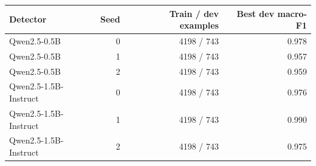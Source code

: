 \begin{tabular}{lrrr}\toprule
Detector & Seed & Train / dev examples & Best dev macro-F1 \\ \midrule
Qwen2.5-0.5B & 0 & 4198 / 743 & 0.978 \\
Qwen2.5-0.5B & 1 & 4198 / 743 & 0.957 \\
Qwen2.5-0.5B & 2 & 4198 / 743 & 0.959 \\
Qwen2.5-1.5B-Instruct & 0 & 4198 / 743 & 0.976 \\
Qwen2.5-1.5B-Instruct & 1 & 4198 / 743 & 0.990 \\
Qwen2.5-1.5B-Instruct & 2 & 4198 / 743 & 0.975 \\
\bottomrule\end{tabular}
